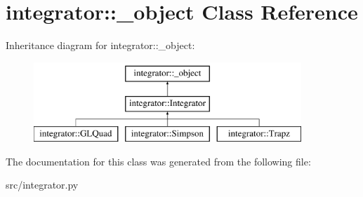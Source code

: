 \hypertarget{classintegrator_1_1__object}{
\section{integrator::\_\-object Class Reference}
\label{d6/d0c/classintegrator_1_1__object}
}
Inheritance diagram for integrator::\_\-object:\begin{figure}[H]
\begin{center}
\leavevmode
\includegraphics[height=3cm]{d6/d0c/classintegrator_1_1__object}
\end{center}
\end{figure}


The documentation for this class was generated from the following file:\begin{DoxyCompactItemize}
\item 
src/integrator.py\end{DoxyCompactItemize}
